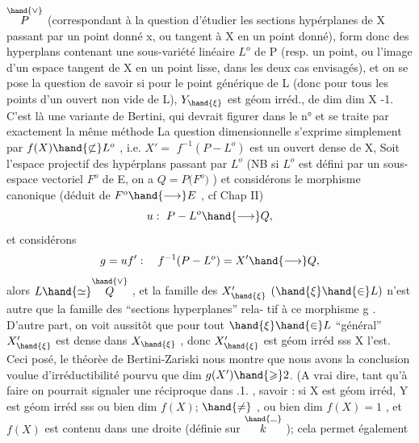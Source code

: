 
$\overset{\hand{\vee}}{P}$ (correspondant à la question d'étudier les sections hypérplanes de X
passant par un point donné x, ou tangent à X en un point  donné),
form donc des hyperplans contenant une sous-variété linéaire $L^{o}$ de P
(resp. un point,  ou l'image d'un espace tangent de X en un point lisse,
dans les deux cas envisagés), et on se pose la question de savoir si
pour le point générique \hand{$\xi$} de L  (donc pour tous les points d'un ouvert
non vide de L),  $Y_{\hand{\xi}}$  est  géom irréd., de
dim  dim X -1.   C'est là une variante  de Bertini, qui devrait figurer
dans  le n°  et se traite par exactement la même méthode  La question
dimensionnelle s'exprime simplement par  $f(X)\hand{\not\subset} L^{o}$ , 
i.e.  $X' =$  $f^{-1}(P - L^{o})$   est un ouvert dense de X, 
Soit  l'espace projectif des hypérplans passant par $L^{o}$  (NB si  $L^{o}$ est
défini par un sous-espace vectoriel $F^{o}$ de E,  on a   $Q = P($$F^{o})$ ) et
considérons le morphisme  canonique  (déduit de  $F^{o}\hand{\longrightarrow} E$ , cf
Chap II)
\[ u :\ P - L^{o} \hand{\longrightarrow} Q, \]
et considérons
\[ g = u f' :\quad f^{-1}(P - L^{o}) = X' \hand{\longrightarrow} Q , \]
alors   $L \hand{\simeq} \overset{\hand{\vee}}{Q}$ ,  et la famille des
$X'_{\hand{\xi}}$  $(\hand{\xi}\hand{\in} L)$  n'est autre que la famille des ``sections hyperplanes'' rela-%
tif à ce morphisme  g . D'autre part, on voit aussitôt que pour tout
$\hand{\xi}\hand{\in} L$  ``général''  $X'_{\hand{\xi}}$ est dense dans $X_{\hand{\xi}}$ , donc  $X'_{\hand{\xi}}$  est géom irréd sss
X  l'est.  Ceci posé,  le théorèe de Bertini-Zariski nous montre que
nous avons la conclusion voulue  d'irréductibilité pourvu que
dim $g(X') \hand{\geqslant} 2$. (A vrai dire, tant qu'à faire on pourrait signaler une
réciproque dans .1. , savoir :  si X est géom irréd, Y  est
géom irréd sss  ou bien  dim $f(X)$; $\hand{\neq}$ , ou bien  dim $f(X)=1$ , et $f(X)$
est contenu dans une droite (définie sur $\overset{\hand{\rule{0.6em}{0.35pt}}}{k}$ )\hand{)}; cela permet également


